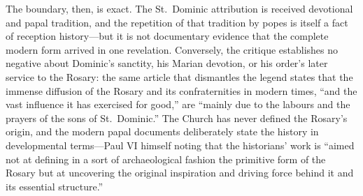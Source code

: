 The boundary, then, is exact. The St.~Dominic attribution is received
devotional and papal tradition, and the repetition of that tradition by
popes is itself a fact of reception history---but it is not documentary
evidence that the complete modern form arrived in one revelation.
Conversely, the critique establishes no negative about Dominic's
sanctity, his Marian devotion, or his order's later service to the
Rosary: the same article that dismantles the legend states that the
immense diffusion of the Rosary and its confraternities in modern times,
``and the vast influence it has exercised for good,'' are ``mainly due
to the labours and the prayers of the sons of St.~Dominic.'' The Church
has never defined the Rosary's origin, and the modern papal documents
deliberately state the history in developmental terms---Paul VI himself
noting that the historians' work is ``aimed not at defining in a sort of
archaeological fashion the primitive form of the Rosary but at uncovering
the original inspiration and driving force behind it and its essential
structure.''
